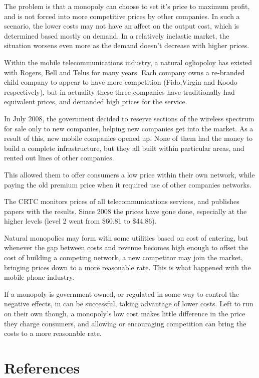 \documentclass{article}
\begin{document}
The problem is that a monopoly can choose to set it's price to maximum profit, and is not forced into more competitive prices by other companies. In such a scenario, the lower costs may not have an affect on the output cost, which is determined based mostly on demand. In a relatively inelastic market, the situation worsens even more as the demand doesn't decrease with higher prices.

Within the mobile telecommunications industry, a natural ogliopoloy has existed with Rogers, Bell and Telus for many years. Each company owns a re-branded child company to appear to have more competition (Fido,Virgin and Koodo respectively), but in actuality these three companies have traditionally had equivalent prices, and demanded high prices for the service.

In July 2008, the government decided to reserve sections of the wireless spectrum for sale only to new companies, helping new companies get into the market. As a result of this, new mobile companies opened up. None of them had the money to build a complete infrastructure, but they all built within particular areas, and rented out lines of other companies.

This allowed them to offer consumers a low price within their own network, while paying the old premium price when it required use of other companies networks.

The CRTC monitors prices of all telecommunications services, and publishes papers with the results. Since 2008 the prices have gone done, especially at the higher levels (level 2 went from \$60.81 to \$44.86).

Natural monopolies may form with some utilities based on cost of entering, but whenever the gap between costs and revenue becomes high enough to offset the cost of building a competing network, a new competitor may join the market, bringing prices down to a more reasonable rate. This is what happened with the mobile phone industry.

If a monopoly is government owned, or regulated in some way to control the negative effects, in can be successful, taking advantage of lower costs. Left to run on their own though, a monopoly's low cost makes little difference in the price they charge consumers, and allowing or encouraging competition can bring the costs to a more reasonable rate.

\section{References}
\end{document}
